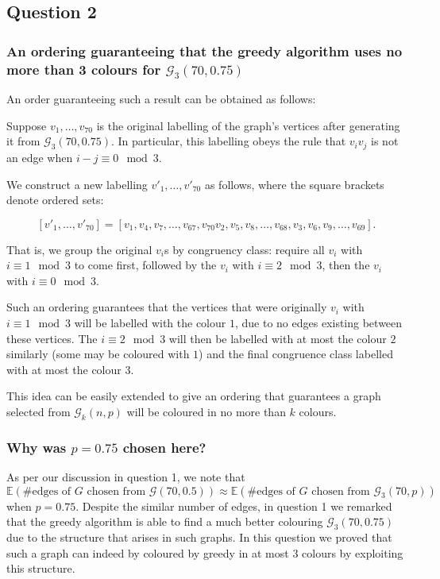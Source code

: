 \documentclass{article}
\begin{document}
\subsection{Question 2}

\subsubsection{An ordering guaranteeing that the greedy algorithm uses no more than 3 colours for $\mathcal{G}_3(70, 0.75)$}

An order guaranteeing such a result can be obtained as follows:

Suppose $v_1, \dots, v_{70}$ is the original labelling of the graph's vertices after generating it from $\mathcal{G}_3(70, 0.75)$. In particular, this labelling obeys the rule that $v_i v_j$ is not an edge when $i - j \equiv 0 \mod 3$.

We construct a new labelling $v'_1, \dots, v'_{70}$ as follows, where the square brackets denote ordered sets:

$$[v'_1, \dots, v'_{70}] = [v_1, v_4, v_7, \dots, v_{67}, v_{70} v_2, v_5, v_8, \dots, v_{68}, v_3, v_6, v_9, \dots, v_{69}].$$

That is, we group the original $v_i$s by congruency class: require all $v_i$ with $i \equiv 1 \mod 3$ to come first, followed by the $v_i$ with $i \equiv 2 \mod 3$, then the $v_i$ with $i \equiv 0 \mod 3$.

Such an ordering guarantees that the vertices that were originally $v_i$ with $i \equiv 1 \mod 3$ will be labelled with the colour $1$, due to no edges existing between these vertices. The $i \equiv 2 \mod 3$ will then be labelled with at most the colour $2$ similarly (some may be coloured with $1$) and the final congruence class labelled with at most the colour $3$.

This idea can be easily extended to give an ordering that guarantees a graph selected from $\mathcal{G}_k(n, p)$ will be coloured in no more than $k$ colours.


\subsubsection{Why was $p=0.75$ chosen here?}

As per our discussion in question 1, we note that $$\mathbb{E}(\text{\#edges of $G$ chosen from $\mathcal{G}(70, 0.5)$}) \approx \mathbb{E}(\text{\#edges of $G$ chosen from $\mathcal{G}_3(70, p)$})$$ when $p=0.75$. Despite the similar number of edges, in question 1 we remarked that the greedy algorithm is able to find a much better colouring $\mathcal{G}_3(70, 0.75)$ due to the structure that arises in such graphs. In this question we proved that such a graph can indeed by coloured by greedy in at most $3$ colours by exploiting this structure.
\end{document}
